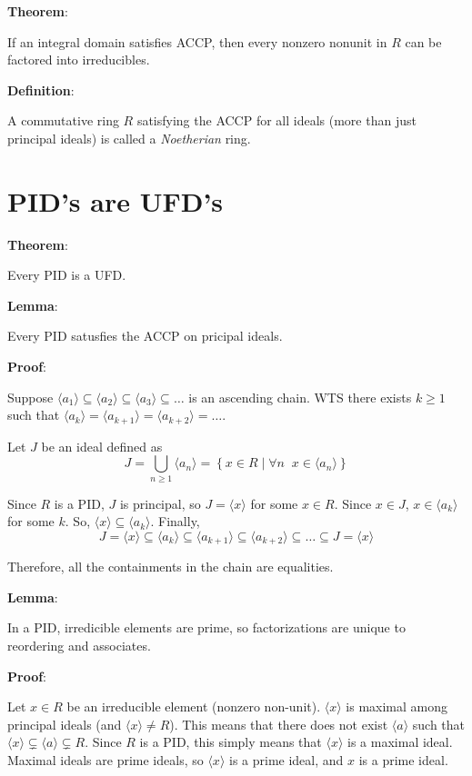 \documentclass{article}
\begin{document}
\begin{multicols*}{2}
\textbf{Theorem}:

If an integral domain satisfies ACCP, then every nonzero nonunit in $R$ can be factored into irreducibles.

\textbf{Definition}:

A commutative ring $R$ satisfying the ACCP for all ideals (more than just principal ideals) is called a \textit{Noetherian} ring.

\section{PID's are UFD's}

\textbf{Theorem}:

Every PID is a UFD.

\textbf{Lemma}:

Every PID satusfies the ACCP on pricipal ideals.

\textbf{Proof}:

Suppose $\langle a_1 \rangle \subseteq \langle a_2 \rangle \subseteq \langle a_3 \rangle \subseteq \dots$ is an ascending chain. WTS there exists $k \geq 1$ such that $\langle a_k \rangle = \langle a_{k+1} \rangle = \langle a_{k+2} \rangle = \dots$.

Let $J$ be an ideal defined as \[J = \bigcup_{n \geq 1} \langle a_n \rangle = \left\{x \in R \;|\; \forall n\;\; x \in \langle a_n \rangle \right\}\]

Since $R$ is a PID, $J$ is principal, so $J = \langle x \rangle$ for some $x \in R$. Since $x \in J$, $x \in \langle a_k \rangle$ for some $k$. So, $\langle x \rangle \subseteq \langle a_k \rangle$. Finally, \[J = \langle x \rangle \subseteq \langle a_k \rangle \subseteq \langle a_{k+1} \rangle \subseteq \langle a_{k+2} \rangle \subseteq \dots \subseteq J = \langle x \rangle\]

Therefore, all the containments in the chain are equalities.

\textbf{Lemma}:

In a PID, irredicible elements are prime, so factorizations are unique to reordering and associates.

\textbf{Proof}:

Let $x \in R$ be an irreducible element (nonzero non-unit). $\langle x \rangle$ is maximal among principal ideals (and $\langle x \rangle \neq R$). This means that there does not exist $\langle a \rangle$ such that $\langle x \rangle \subsetneq \langle a \rangle \subsetneq R$. Since $R$ is a PID, this simply means that $\langle x \rangle$ is a maximal ideal. Maximal ideals are prime ideals, so $\langle x \rangle$ is a prime ideal, and $x$ is a prime ideal.


\end{multicols*}
\end{document}
